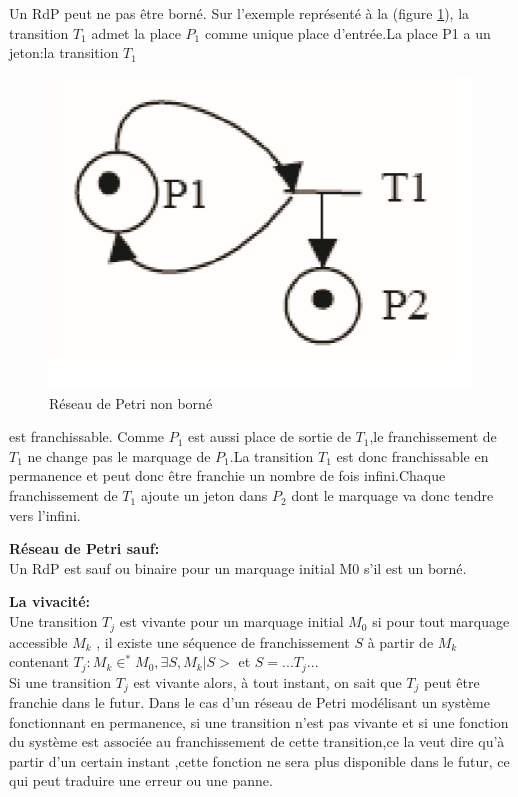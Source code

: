 \begin{exmp}
 Un RdP peut ne pas être borné. Sur l'exemple représenté à la (figure \ref{fig:rdpborn}), la transition $ T_{1} $ admet la place $ P_{1} $ comme unique place d'entrée.La place P1 a un jeton:la transition $ T_{1} $
\end{exmp}

\begin{figure}[h]
	\centering
	\includegraphics[width=0.5\linewidth]{images/Rdpborn}
	\caption{Réseau de Petri non borné}
	\label{fig:rdpborn}
\end{figure}

est franchissable. Comme $ P_{1} $ est aussi place de sortie de $ T_{1} $,le franchissement de $ T_{1} $ ne change pas le marquage de $ P_{1} $.La transition $ T_{1} $ est donc franchissable en permanence et peut donc être franchie un nombre de fois infini.Chaque franchissement de $ T_{1} $ ajoute un jeton dans $ P_{2} $ dont le marquage va donc tendre vers l'infini.

\begin{defn}\textbf{Réseau de Petri sauf:}\\
	Un RdP est sauf ou binaire pour un marquage initial M0 s'il est un borné.
 
\end{defn}


\begin{defn}\textbf{La vivacité:}\\
	Une transition $ T_{j} $ est vivante pour un marquage initial $ M_{0} $ si pour tout marquage accessible $ M_{k} $ , il existe une séquence de franchissement $ S $ à partir de $ M_{k} $ contenant $T_{j}: M_{k} \in^{*} M_{0},   \exists S,M_{k}| S>$ et $S = ... T_{j} ...$
	\\
	
	Si une transition $ T_{j} $ est vivante alors, à tout instant, on sait que $ T_{j} $ peut être franchie dans le futur. Dans le cas d'un réseau de Petri modélisant un système fonctionnant en permanence, si une transition n'est pas vivante et si une fonction du système est associée au franchissement de cette transition,ce la veut dire qu'à partir d’un certain instant ,cette fonction ne sera plus disponible dans le futur, ce qui peut traduire une erreur ou une panne.
	
\end{defn}



